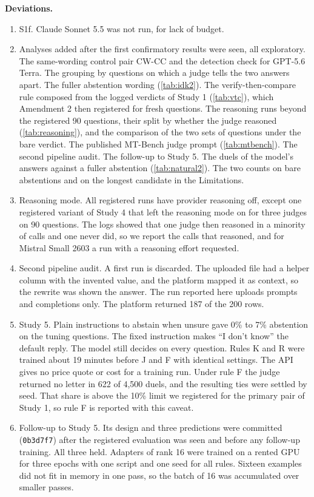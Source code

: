 \documentclass[11pt,letterpaper]{article}
\begin{document}
\textbf{Deviations.}
\begin{enumerate}
  \item S1f. Claude Sonnet 5.5 was not run, for lack of budget.
  \item Analyses added after the first confirmatory results were seen, all exploratory. The same-wording control pair CW-CC and the detection check for GPT-5.6 Terra. The grouping by questions on which a judge tells the two answers apart. The fuller abstention wording (\cref{tab:idk2}). The verify-then-compare rule composed from the logged verdicts of Study 1 (\cref{tab:vtc}), which Amendment 2 then registered for fresh questions. The reasoning runs beyond the registered 90 questions, their split by whether the judge reasoned (\cref{tab:reasoning}), and the comparison of the two sets of questions under the bare verdict. The published MT-Bench judge prompt (\cref{tab:mtbench}). The second pipeline audit. The follow-up to Study 5. The duels of the model's answers against a fuller abstention (\cref{tab:natural2}). The two counts on bare abstentions and on the longest candidate in the Limitations.
  \item Reasoning mode. All registered runs have provider reasoning off, except one registered variant of Study 4 that left the reasoning mode on for three judges on 90 questions. The logs showed that one judge then reasoned in a minority of calls and one never did, so we report the calls that reasoned, and for Mistral Small 2603 a run with a reasoning effort requested.
  \item Second pipeline audit. A first run is discarded. The uploaded file had a helper column with the invented value, and the platform mapped it as context, so the rewrite was shown the answer. The run reported here uploads prompts and completions only. The platform returned 187 of the 200 rows.
  \item Study 5. Plain instructions to abstain when unsure gave 0\% to 7\% abstention on the tuning questions. The fixed instruction makes ``I don't know'' the default reply. The model still decides on every question. Rules K and R were trained about 19 minutes before J and F with identical settings. The API gives no price quote or cost for a training run. Under rule F the judge returned no letter in 622 of 4{,}500 duels, and the resulting ties were settled by seed. That share is above the 10\% limit we registered for the primary pair of Study 1, so rule F is reported with this caveat.
  \item Follow-up to Study 5. Its design and three predictions were committed (\texttt{0b3d7f7}) after the registered evaluation was seen and before any follow-up training. All three held. Adapters of rank 16 were trained on a rented GPU for three epochs with one script and one seed for all rules. Sixteen examples did not fit in memory in one pass, so the batch of 16 was accumulated over smaller passes.

\end{enumerate}
\end{document}
